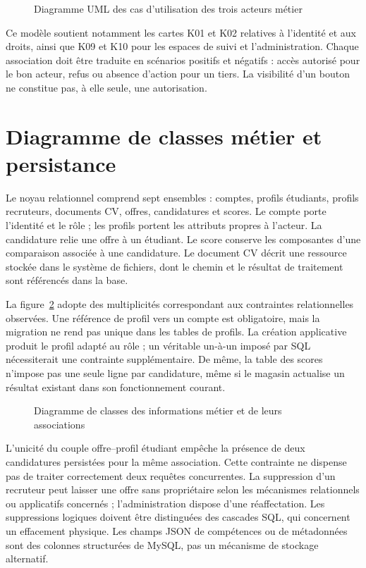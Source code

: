 \begin{figure}[H]\centering
\resizebox{.9\textwidth}{!}{}
\caption{Diagramme UML des cas d'utilisation des trois acteurs métier}
\label{fig:uml-usecases}\end{figure}

Ce modèle soutient notamment les cartes K01 et K02 relatives à l'identité et aux droits, ainsi que K09 et K10 pour les espaces de suivi et l'administration. Chaque association doit être traduite en scénarios positifs et négatifs : accès autorisé pour le bon acteur, refus ou absence d'action pour un tiers. La visibilité d'un bouton ne constitue pas, à elle seule, une autorisation.

\section{Diagramme de classes métier et persistance}
Le noyau relationnel comprend sept ensembles : comptes, profils étudiants, profils recruteurs, documents CV, offres, candidatures et scores. Le compte porte l'identité et le rôle ; les profils portent les attributs propres à l'acteur. La candidature relie une offre à un étudiant. Le score conserve les composantes d'une comparaison associée à une candidature. Le document CV décrit une ressource stockée dans le système de fichiers, dont le chemin et le résultat de traitement sont référencés dans la base.

La figure~\ref{fig:uml-classes} adopte des multiplicités correspondant aux contraintes relationnelles observées. Une référence de profil vers un compte est obligatoire, mais la migration ne rend pas  unique dans les tables de profils. La création applicative produit le profil adapté au rôle ; un véritable un-à-un imposé par SQL nécessiterait une contrainte supplémentaire. De même, la table des scores n'impose pas une seule ligne par candidature, même si le magasin actualise un résultat existant dans son fonctionnement courant.

\begin{figure}[H]\centering
\resizebox{\textwidth}{!}{}
\caption{Diagramme de classes des informations métier et de leurs associations}
\label{fig:uml-classes}\end{figure}

L'unicité du couple offre--profil étudiant empêche la présence de deux candidatures persistées pour la même association. Cette contrainte ne dispense pas de traiter correctement deux requêtes concurrentes. La suppression d'un recruteur peut laisser une offre sans propriétaire selon les mécanismes relationnels ou applicatifs concernés ; l'administration dispose d'une réaffectation. Les suppressions logiques doivent être distinguées des cascades SQL, qui concernent un effacement physique. Les champs JSON de compétences ou de métadonnées sont des colonnes structurées de MySQL, pas un mécanisme de stockage alternatif.

